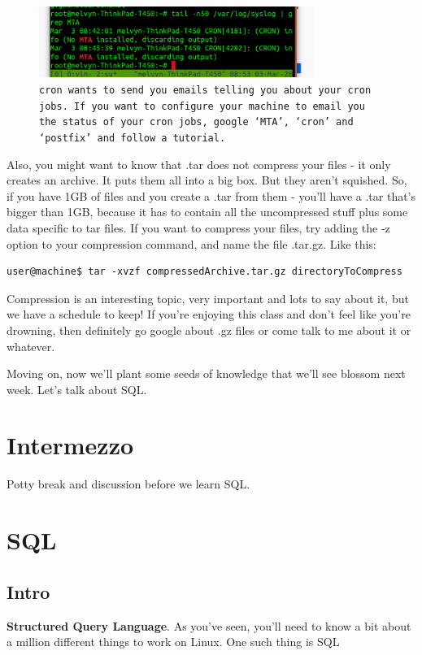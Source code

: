 \documentclass[12pt,a4paper]{article}
\begin{document}
\begin{figure}[h]
\centering
	\includegraphics[width=0.8\textwidth]{Images/cronOutput.png}
	\caption{{\small \texttt{cron wants to send you emails telling you about your cron jobs. If
you want to configure your machine to email you the status of your cron jobs,
google `MTA', `cron' and `postfix' and follow a tutorial.}}}
	\label{fig:mta}
\end{figure}

Also, you might want to know that .tar does not compress your files - it only
creates an archive. It puts them all into a big box. But they aren't squished.
So, if you have 1GB of files and you create a .tar from them - you'll have a
.tar that's bigger than 1GB, because it has to contain all the uncompressed
stuff plus some data specific to tar files. If you want to compress your files,
try adding the -z option to your compression command, and name the file .tar.gz.
Like this:

\begin{lstlisting}[style=term]
user@machine$ tar -xvzf compressedArchive.tar.gz directoryToCompress
\end{lstlisting}

Compression is an interesting topic, very important and lots to say about it,
but we have a schedule to keep! If you're enjoying this class and don't feel
like you're drowning, then definitely go google about .gz files or come talk to
me about it or whatever.

Moving on, now we'll plant some seeds of knowledge that we'll see blossom next
week. Let's talk about SQL.

\section{Intermezzo}

Potty break and discussion before we learn SQL.

\section{SQL}
\subsection{Intro}
\textbf{Structured Query Language}. As you've seen, you'll need to know a bit
about a million different things to work on Linux. One such thing is SQL
\end{document}
